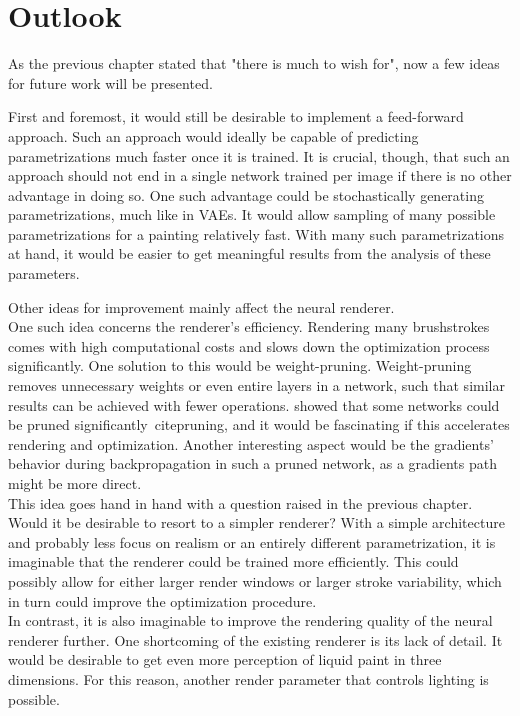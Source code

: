 \setchapterpreamble[u]{\margintoc}
\chapter{Outlook}

As the previous chapter stated that "there is much to wish for", now a few ideas for future work will be presented.

First and foremost, it would still be desirable to implement a feed-forward approach.
Such an approach would ideally be capable of predicting parametrizations much faster once it is trained.
It is crucial, though, that such an approach should not end in a single network trained per image if there is no other advantage in doing so.
One such advantage could be stochastically generating parametrizations, much like in VAEs.
It would allow sampling of many possible parametrizations for a painting relatively fast.
With many such parametrizations at hand, it would be easier to get meaningful results from the analysis of these parameters.

Other ideas for improvement mainly affect the neural renderer.\\
One such idea concerns the renderer's efficiency.
Rendering many brushstrokes comes with high computational costs and slows down the optimization process significantly.
One solution to this would be weight-pruning.
Weight-pruning removes unnecessary weights or even entire layers in a network, such that similar results can be achieved with fewer operations.
\citeauthor*{pruning} showed that some networks could be pruned significantly~cite{pruning}, and it would be fascinating if this accelerates rendering and optimization.
Another interesting aspect would be the gradients' behavior during backpropagation in such a pruned network, as a gradients path might be more direct.\\
This idea goes hand in hand with a question raised in the previous chapter.
Would it be desirable to resort to a simpler renderer?
With a simple architecture and probably less focus on realism or an entirely different parametrization, it is imaginable that the renderer could be trained more efficiently.
This could possibly allow for either larger render windows or larger stroke variability, which in turn could improve the optimization procedure. \\
In contrast, it is also imaginable to improve the rendering quality of the neural renderer further.
One shortcoming of the existing renderer is its lack of detail.
It would be desirable to get even more perception of liquid paint in three dimensions.
For this reason, another render parameter that controls lighting is possible. \\

